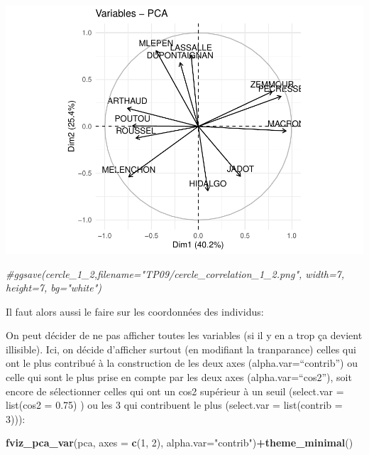 \documentclass[
]{book}
\newenvironment{Shaded}{\begin{snugshade}}{\end{snugshade}}
\newcommand{\AttributeTok}[1]{\textcolor[rgb]{0.13,0.29,0.53}{#1}}
\newcommand{\CommentTok}[1]{\textcolor[rgb]{0.56,0.35,0.01}{\textit{#1}}}
\newcommand{\DecValTok}[1]{\textcolor[rgb]{0.00,0.00,0.81}{#1}}
\newcommand{\FunctionTok}[1]{\textcolor[rgb]{0.13,0.29,0.53}{\textbf{#1}}}
\newcommand{\NormalTok}[1]{#1}
\newcommand{\OtherTok}[1]{\textcolor[rgb]{0.56,0.35,0.01}{#1}}
\newcommand{\SpecialCharTok}[1]{\textcolor[rgb]{0.81,0.36,0.00}{\textbf{#1}}}
\newcommand{\StringTok}[1]{\textcolor[rgb]{0.31,0.60,0.02}{#1}}
\begin{document}
\includegraphics{bookdown-demo_files/figure-latex/unnamed-chunk-64-1.pdf}

\begin{Shaded}
\begin{Highlighting}[]
\CommentTok{\#ggsave(cercle\_1\_2,filename="TP09/cercle\_correlation\_1\_2.png", width=7, height=7, bg="white")}
\end{Highlighting}
\end{Shaded}

Il faut alors aussi le faire sur les coordonnées des individus:

\begin{Shaded}
\end{Shaded}

On peut décider de ne pas afficher toutes les variables (si il y en a trop ça devient illisible). Ici, on décide d'afficher surtout (en modifiant la tranparance) celles qui ont le plus contribué à la construction de les deux axes (alpha.var=``contrib'') ou celle qui sont le plus prise en compte par les deux axes (alpha.var=``cos2''), soit encore de sélectionner celles qui ont un cos2 supérieur à un seuil (select.var = list(cos2 = 0.75) ) ou les 3 qui contribuent le plus (select.var = list(contrib = 3))):

\begin{Shaded}
\begin{Highlighting}[]
\FunctionTok{fviz\_pca\_var}\NormalTok{(pca,  }\AttributeTok{axes =} \FunctionTok{c}\NormalTok{(}\DecValTok{1}\NormalTok{, }\DecValTok{2}\NormalTok{), }\AttributeTok{alpha.var=}\StringTok{"contrib"}\NormalTok{)}\SpecialCharTok{+}\FunctionTok{theme\_minimal}\NormalTok{()}
\end{Highlighting}
\end{Shaded}
\end{document}
